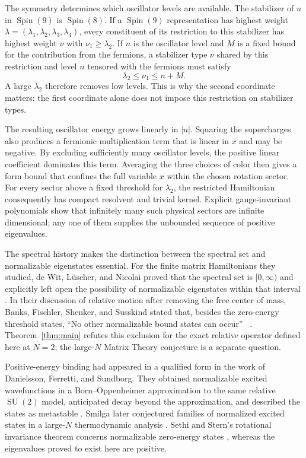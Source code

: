 \documentclass[11pt]{amsart}
\newcommand{\Spin}{\operatorname{Spin}}
\newcommand{\SU}{\operatorname{SU}}
\theoremstyle{remark}
\numberwithin{equation}{section}
\begin{document}
The symmetry determines which oscillator levels are available. The
stabilizer of $u$ in $\Spin(9)$ is $\Spin(8)$. If a $\Spin(9)$
representation has highest weight
$\lambda=(\lambda_1,\lambda_2,\lambda_3,\lambda_4)$, every constituent
of its restriction to this stabilizer has highest weight $\nu$ with
$\nu_1\geq\lambda_2$. If $n$ is the oscillator level and $M$ is a
fixed bound for the contribution from the fermions, a stabilizer type
$\nu$ shared by this restriction and level $n$ tensored with the
fermions must satisfy
\[
 \lambda_2\leq\nu_1\leq n+M.
\]
A large $\lambda_2$ therefore removes low levels. This is why the second
coordinate matters: the first coordinate alone does not impose this
restriction on stabilizer types.

The resulting oscillator energy grows linearly in $|u|$. Squaring the
supercharges also produces a fermionic multiplication term that is linear
in $x$ and may be negative. By excluding sufficiently many oscillator
levels, the positive linear coefficient dominates this term. Averaging
the three choices of color then gives a form bound that confines the
full variable $x$ within the chosen rotation sector. For every sector
above a fixed threshold for $\lambda_2$, the restricted Hamiltonian
consequently has compact resolvent and trivial kernel. Explicit
gauge-invariant polynomials
show that infinitely many such physical sectors are infinite
dimensional; any one of them supplies the unbounded sequence of
positive eigenvalues.

The spectral history makes the distinction between the spectral set
and normalizable eigenstates essential. For the finite matrix
Hamiltonians they studied, de Wit, L\"uscher, and Nicolai proved that
the spectral set is $[0,\infty)$ and explicitly left open the
possibility of normalizable eigenstates within that interval
\cite[Section~1]{deWitLuscherNicolai}. In their discussion of relative
motion after removing the free center of mass, Banks, Fischler, Shenker,
and Susskind stated that, besides the zero-energy threshold states,
\textquotedblleft No other normalizable bound states can occur\textquotedblright~
\cite[Section~5, after Equation~(5.4)]{BFSS}. Theorem~\ref{thm:main}
refutes this exclusion for the exact relative operator defined here
at $N=2$; the large-$N$ Matrix Theory conjecture is a separate question.

Positive-energy binding had appeared in a qualified form in the work
of Danielsson, Ferretti, and Sundborg. They obtained normalizable
excited wavefunctions in a Born--Oppenheimer approximation to the same
relative $\SU(2)$ model, anticipated decay beyond the approximation,
and described the states as metastable
\cite[Sections~3.3 and 4--5]{DanielssonFerrettiSundborg}. Smilga later
conjectured families of normalized excited states in a large-$N$
thermodynamic analysis \cite[Section~3]{Smilga}. Sethi and Stern's
rotational invariance theorem concerns normalizable zero-energy
states \cite[Sections~3.2 and 4.2]{SethiSternInvariance}, whereas the
eigenvalues proved to exist here are positive.
\end{document}
